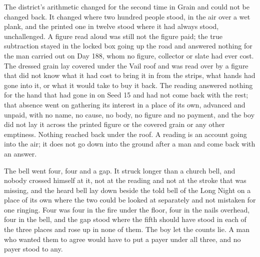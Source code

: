 The district's arithmetic changed for the second time in Grain and could not be changed back. It changed where two hundred people stood, in the air over a wet plank, and the printed one in twelve stood where it had always stood, unchallenged. A figure read aloud was still not the figure paid; the true subtraction stayed in the locked box going up the road and answered nothing for the man carried out on Day 188, whom no figure, collector or slate had ever cost. The dressed grain lay covered under the Vail roof and was read over by a figure that did not know what it had cost to bring it in from the strips, what hands had gone into it, or what it would take to buy it back. The reading answered nothing for the hand that had gone in on Seed 15 and had not come back with the rest; that absence went on gathering its interest in a place of its own, advanced and unpaid, with no name, no cause, no body, no figure and no payment, and the boy did not lay it across the printed figure or the covered grain or any other emptiness. Nothing reached back under the roof. A reading is an account going into the air; it does not go down into the ground after a man and come back with an answer.

\scenebreak

The bell went four, four and a gap. It struck longer than a church bell, and nobody crossed himself at it, not at the reading and not at the stroke that was missing, and the heard bell lay down beside the told bell of the Long Night on a place of its own where the two could be looked at separately and not mistaken for one ringing. Four was four in the fire under the floor, four in the nails overhead, four in the bell, and the gap stood where the fifth should have stood in each of the three places and rose up in none of them. The boy let the counts lie. A man who wanted them to agree would have to put a payer under all three, and no payer stood to any.

